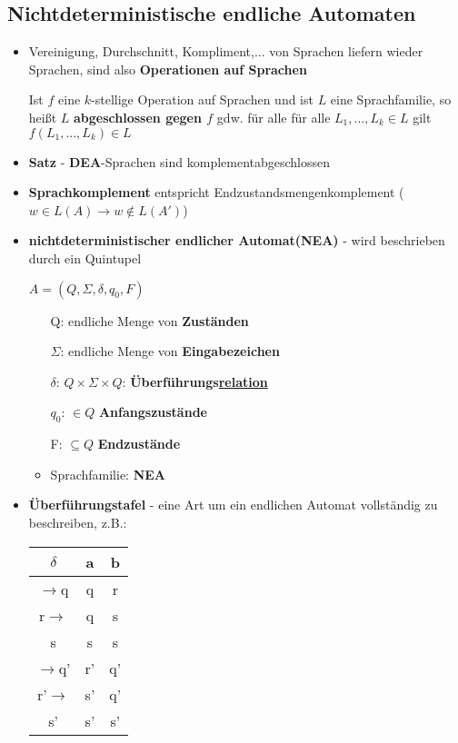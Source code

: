 \documentclass[12pt, a4paper]{article}
\begin{document}
	\subsection{Nichtdeterministische endliche Automaten}
	\begin{itemize}
		
		\item Vereinigung, Durchschnitt, Kompliment,... von Sprachen liefern wieder Sprachen, sind also \textbf{Operationen auf Sprachen}
		
		Ist $f$ eine $k$-stellige Operation auf Sprachen und ist $L$ eine Sprachfamilie, so heißt $L$ \textbf{abgeschlossen gegen $f$} gdw. für alle für alle $L_{1},...,L_{k}\in L$ gilt $f(L_{1},...,L_{k})\in L$
		
		\item \textbf{Satz} - \textbf{DEA}-Sprachen sind komplementabgeschlossen
		
		\item \textbf{Sprachkomplement} entspricht Endzustandsmengenkomplement ($w\in L(A)\rightarrow w\notin L(A')$)
		
		\item \textbf{nichtdeterministischer endlicher Automat(NEA)} - wird beschrieben durch ein Quintupel
		\begin{center}
			$A=(Q,\Sigma,\delta,q_{0},F)$
		\end{center}
		\begin{itemize}
			\item[Q:] endliche Menge von \textbf{Zuständen}
			\item[$\Sigma$:] endliche Menge von \textbf{Eingabezeichen}
			\item[$\delta$:] $Q\times\Sigma\times Q$: \textbf{Überführungs\underline{relation}}
			\item[$q_{0}$:] $\in Q$ \textbf{Anfangszustände}
			\item[F:] $\subseteq Q$ \textbf{Endzustände}
			\item Sprachfamilie: \textbf{NEA}
		\end{itemize}
		
		\item \textbf{Überführungstafel} - eine Art um ein endlichen Automat vollständig zu beschreiben, z.B.:
		\begin{center}
			\begin{tabular}{c||c c }
				$\delta$ & a & b \\
				\hline \hline
				$\rightarrow$q & q & r \\
				r$\rightarrow$ & q & s \\
				s & s & s \\
				$\rightarrow$q' & r' & q' \\
				r'$\rightarrow$ & s' & q' \\
				s' & s' & s' \\
			\end{tabular}
		\end{center}
		

\end{itemize}
\end{document}

